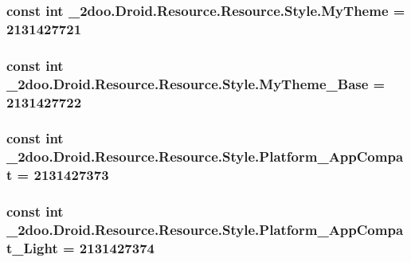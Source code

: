 \hypertarget{class__2doo_1_1_droid_1_1_resource_1_1_style_ef15d60d8f145604b7cfd9701fddc784}{
\subsubsection[{MyTheme}]{\setlength{\rightskip}{0pt plus 5cm}const int \_\-2doo.Droid.Resource.Resource.Style.MyTheme = 2131427721}}
\label{class__2doo_1_1_droid_1_1_resource_1_1_style_ef15d60d8f145604b7cfd9701fddc784}


\hypertarget{class__2doo_1_1_droid_1_1_resource_1_1_style_5cb0bee74161e98760a723023f2b74db}{
\subsubsection[{MyTheme\_\-Base}]{\setlength{\rightskip}{0pt plus 5cm}const int \_\-2doo.Droid.Resource.Resource.Style.MyTheme\_\-Base = 2131427722}}
\label{class__2doo_1_1_droid_1_1_resource_1_1_style_5cb0bee74161e98760a723023f2b74db}


\hypertarget{class__2doo_1_1_droid_1_1_resource_1_1_style_188184b20b44c40aa843c9a8d5871037}{
\subsubsection[{Platform\_\-AppCompat}]{\setlength{\rightskip}{0pt plus 5cm}const int \_\-2doo.Droid.Resource.Resource.Style.Platform\_\-AppCompat = 2131427373}}
\label{class__2doo_1_1_droid_1_1_resource_1_1_style_188184b20b44c40aa843c9a8d5871037}


\hypertarget{class__2doo_1_1_droid_1_1_resource_1_1_style_2dfc295e7ac870e19c4c441a793ae52c}{
\subsubsection[{Platform\_\-AppCompat\_\-Light}]{\setlength{\rightskip}{0pt plus 5cm}const int \_\-2doo.Droid.Resource.Resource.Style.Platform\_\-AppCompat\_\-Light = 2131427374}}
\label{class__2doo_1_1_droid_1_1_resource_1_1_style_2dfc295e7ac870e19c4c441a793ae52c}


